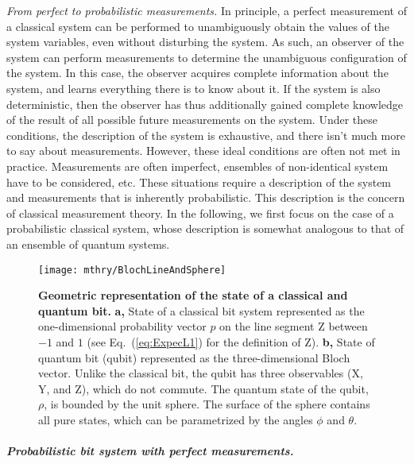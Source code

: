 \emph{From perfect to probabilistic measurements. }In principle, a
perfect measurement of a classical system can be performed to unambiguously
obtain the values of the system variables, even without disturbing
the system. As such, an observer of the system can perform measurements
to determine the unambiguous configuration of the system. In this
case, the observer acquires complete information about the system,
and learns everything there is to know about it. If the system is
also deterministic, then the observer has thus additionally gained
complete knowledge of the result of all possible future measurements
on the system. Under these conditions, the description of the system
is exhaustive, and there isn't much more to say about measurements.
However, these ideal conditions are often not met in practice. Measurements
are often imperfect, ensembles of non-identical system have to be
considered, etc.  These situations require a description of the system
and measurements that is inherently probabilistic. This description
is the concern of classical measurement theory. In the following,
we first focus on the case of a probabilistic classical system, whose
description is somewhat analogous to that of an ensemble of quantum
systems.

\begin{figure}
\begin{centering}
\texttt{[image: mthry/BlochLineAndSphere]}
\par\end{centering}
\caption[Geometric representation of the state of a classical and quantum bit]{\textbf{Geometric representation of the state of a classical and
quantum bit.} \textbf{\label{fig:Geometric-representation-of}a, }State
of a classical bit system represented as the one-dimensional probability
vector $p$ on the line segment Z between $-1$ and $1$ (see Eq.~(\ref{eq:ExpecL1})
for the definition of Z). \textbf{b, }State of quantum bit (qubit)
represented as the three-dimensional Bloch vector.  Unlike the classical
bit, the qubit has three observables (X, Y, and Z), which do not commute.
The quantum state of the qubit, $\rho$, is bounded by the unit sphere.
The surface of the sphere contains all pure states, which can be parametrized
by the angles $\phi$ and $\theta$. }
\end{figure}


\paragraph{\emph{Probabilistic bit system with perfect measurements.}}

